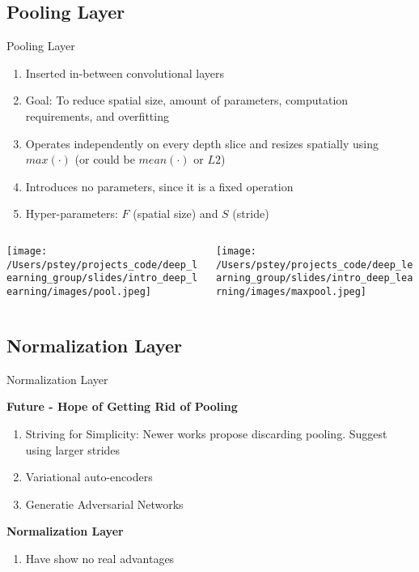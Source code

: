 \documentclass[pdf]{beamer}
\begin{document}
\subsection{Pooling Layer}
	\begin{frame}{Pooling Layer}
	\begin{enumerate}
		\item Inserted in-between convolutional layers
		\item Goal: To reduce spatial size, amount of parameters, computation requirements, and overfitting
		\item Operates independently on every depth slice and resizes spatially using $max(\cdot)$ (or could be $mean(\cdot)$ or $L2$)
		\item Introduces no parameters, since it is a fixed operation
		\item Hyper-parameters: $F$ (spatial size) and $S$ (stride)
	\end{enumerate}
	\begin{columns}
	\begin{column}{0.25\textwidth}
	\begin{center}
		\texttt{[image: /Users/pstey/projects\_code/deep\_learning\_group/slides/intro\_deep\_learning/images/pool.jpeg]}
	\end{center}
	\end{column}
	\begin{column}{0.75\textwidth}
	\begin{center}
		\texttt{[image: /Users/pstey/projects\_code/deep\_learning\_group/slides/intro\_deep\_learning/images/maxpool.jpeg]}
	\end{center}
	\end{column}
	
	\end{columns}

	\end{frame}
	
\subsection{Normalization Layer}
	\begin{frame}{Normalization Layer}
	
	\textbf{Future - Hope of Getting Rid of Pooling}
	\vspace{1em}
		\begin{enumerate}
			\item Striving for Simplicity: Newer works propose discarding pooling. Suggest using larger strides
			\item Variational auto-encoders
			\item Generatie Adversarial Networks
		\end{enumerate}
	\vspace{2em}
	\textbf{Normalization Layer}
		\begin{enumerate}
			\item Have show no real advantages
		\end{enumerate}
	\end{frame}
	
\end{document}

